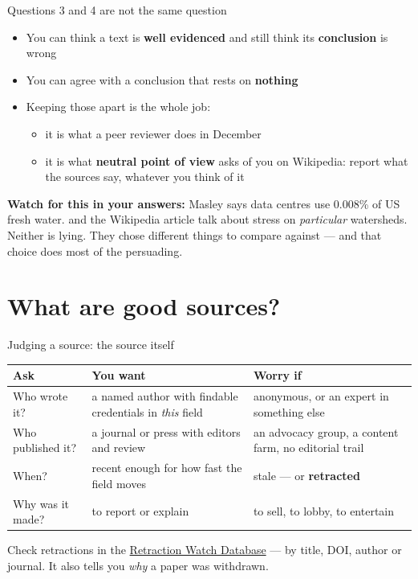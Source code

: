 \documentclass[aspectratio=169]{beamer}
\begin{document}
\begin{frame}{Questions 3 and 4 are not the same question}
\begin{itemize}
  \item You can think a text is \textbf{well evidenced} and still think its
    \textbf{conclusion} is wrong
  \item You can agree with a conclusion that rests on \textbf{nothing}
  \item Keeping those apart is the whole job:
    \begin{itemize}
    \item it is what a peer reviewer does in December
    \item it is what \textbf{neutral point of view} asks of you on Wikipedia:
      report what the sources say, whatever you think of it
    \end{itemize}
\end{itemize}
\vspace{2ex}
\textbf{Watch for this in your answers:} Masley says data centres use 0.008\%
of US fresh water.  \citet{Mytton2021} and the Wikipedia article talk about
stress on \emph{particular} watersheds.  Neither is lying.  They chose
different things to compare against --- and that choice does most of the
persuading.
\end{frame}

\section{What are good sources?}

 











\begin{frame}{Judging a source: the source itself}
\small
\begin{tabular}{@{}p{}p{}p{}@{}}
\toprule
\textbf{Ask} & \textbf{You want} & \textbf{Worry if} \\
\midrule
Who wrote it?      & a named author with findable credentials in \emph{this} field
                   & anonymous, or an expert in something else \\
\addlinespace
Who published it?  & a journal or press with editors and review
                   & an advocacy group, a content farm, no editorial trail \\
\addlinespace
When?              & recent enough for how fast the field moves
                   & stale --- or \textbf{retracted} \\
\addlinespace
Why was it made?   & to report or explain
                   & to sell, to lobby, to entertain \\
\bottomrule
\end{tabular}
\vspace{1ex}

Check retractions in the \href{https://retractiondatabase.org}{Retraction Watch
Database} --- by title, DOI, author or journal.  It also tells you \emph{why} a
paper was withdrawn.
\end{frame}
\end{document}
